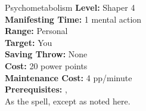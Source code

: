{Psychometabolism}
{
	\textbf{Level:}
	Shaper 4\\
	\textbf{Manifesting Time:}
	1 mental action\\
	\textbf{Range:}
	Personal\\
	\textbf{Target:}
	You\\
	\textbf{Saving Throw:}
	None\\
	\textbf{Cost:}
	20 power points\\
	\textbf{Maintenance Cost:}
	4 pp/minute\\
	\textbf{Prerequisites:}
	, \\
}
{
	As the  spell, except as noted here.
}